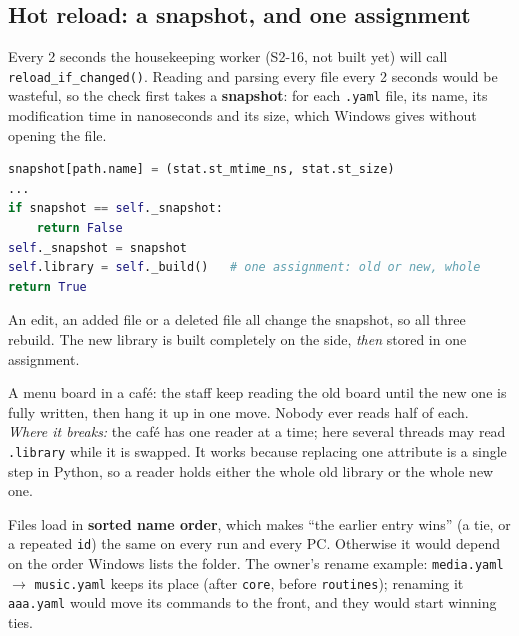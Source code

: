 \documentclass[11pt,a4paper]{article}
\begin{document}
\subsection{Hot reload: a snapshot, and one assignment}
Every 2 seconds the housekeeping worker (S2-16, not built yet) will call
\texttt{reload\_if\_changed()}. Reading and parsing every file every 2 seconds would be wasteful, so
the check first takes a \textbf{snapshot}: for each \texttt{.yaml} file, its name, its
modification time in nanoseconds and its size, which Windows gives without opening the file.
\begin{lstlisting}[language=Python]
snapshot[path.name] = (stat.st_mtime_ns, stat.st_size)
...
if snapshot == self._snapshot:
    return False
self._snapshot = snapshot
self.library = self._build()   # one assignment: old or new, whole
return True
\end{lstlisting}
\noindent An edit, an added file or a deleted file all change the snapshot, so all three rebuild.
The new library is built completely on the side, \emph{then} stored in one assignment.

\begin{analogy}
A menu board in a caf\'e: the staff keep reading the old board until the new one is fully
written, then hang it up in one move. Nobody ever reads half of each. \emph{Where it breaks:} the
caf\'e has one reader at a time; here several threads may read \texttt{.library} while it is
swapped. It works because replacing one attribute is a single step in Python, so a reader holds
either the whole old library or the whole new one.
\end{analogy}

Files load in \textbf{sorted name order}, which makes ``the earlier entry wins'' (a tie, or a
repeated \texttt{id}) the same on every run and every PC. Otherwise it would depend on the order
Windows lists the folder. The owner's rename example: \texttt{media.yaml} $\to$
\texttt{music.yaml} keeps its place (after \texttt{core}, before \texttt{routines}); renaming it
\texttt{aaa.yaml} would move its commands to the front, and they would start winning ties.
\end{document}
